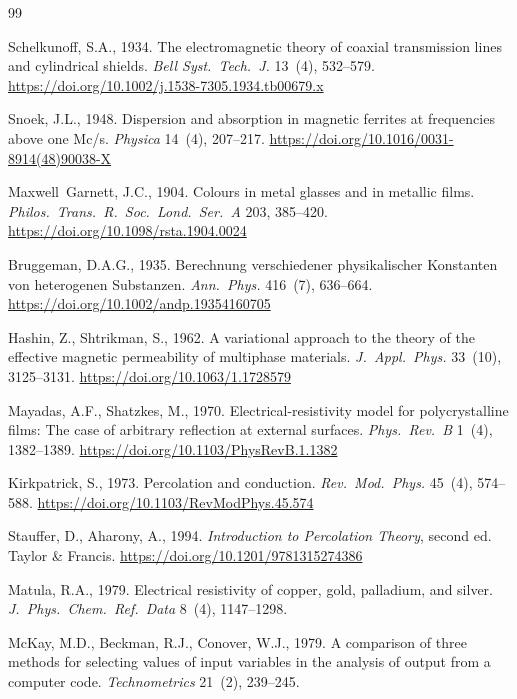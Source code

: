 \documentclass[review,3p,authoryear]{elsarticle}
\begin{document}
\begin{thebibliography}{99}

Schelkunoff, S.A., 1934.
The electromagnetic theory of coaxial transmission lines and cylindrical shields.
\textit{Bell Syst.\ Tech.\ J.} 13~(4), 532--579.
\url{https://doi.org/10.1002/j.1538-7305.1934.tb00679.x}

Snoek, J.L., 1948.
Dispersion and absorption in magnetic ferrites at frequencies above one Mc/s.
\textit{Physica} 14~(4), 207--217.
\url{https://doi.org/10.1016/0031-8914(48)90038-X}

Maxwell~Garnett, J.C., 1904.
Colours in metal glasses and in metallic films.
\textit{Philos.\ Trans.\ R.\ Soc.\ Lond.\ Ser.\ A} 203, 385--420.
\url{https://doi.org/10.1098/rsta.1904.0024}

Bruggeman, D.A.G., 1935.
Berechnung verschiedener physikalischer Konstanten von heterogenen Substanzen.
\textit{Ann.\ Phys.} 416~(7), 636--664.
\url{https://doi.org/10.1002/andp.19354160705}

Hashin, Z., Shtrikman, S., 1962.
A variational approach to the theory of the effective magnetic permeability of multiphase materials.
\textit{J.\ Appl.\ Phys.} 33~(10), 3125--3131.
\url{https://doi.org/10.1063/1.1728579}

Mayadas, A.F., Shatzkes, M., 1970.
Electrical-resistivity model for polycrystalline films: The case of arbitrary reflection at external surfaces.
\textit{Phys.\ Rev.\ B} 1~(4), 1382--1389.
\url{https://doi.org/10.1103/PhysRevB.1.1382}

Kirkpatrick, S., 1973.
Percolation and conduction.
\textit{Rev.\ Mod.\ Phys.} 45~(4), 574--588.
\url{https://doi.org/10.1103/RevModPhys.45.574}

Stauffer, D., Aharony, A., 1994.
\textit{Introduction to Percolation Theory}, second ed. Taylor \& Francis.
\url{https://doi.org/10.1201/9781315274386}

Matula, R.A., 1979.
Electrical resistivity of copper, gold, palladium, and silver.
\textit{J.\ Phys.\ Chem.\ Ref.\ Data} 8~(4), 1147--1298.

McKay, M.D., Beckman, R.J., Conover, W.J., 1979.
A comparison of three methods for selecting values of input variables in the analysis of output from a computer code.
\textit{Technometrics} 21~(2), 239--245.


\end{thebibliography}
\end{document}
